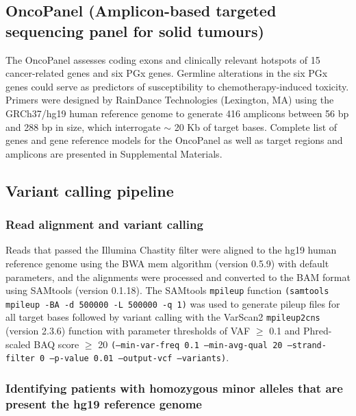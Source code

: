 \documentclass{bmcart}
\begin{document}
\subsection*{OncoPanel (Amplicon-based targeted sequencing panel for solid tumours)}

The OncoPanel assesses coding exons and clinically relevant hotspots of 15 cancer-related genes and six PGx genes. Germline alterations in the six PGx genes could serve as predictors of susceptibility to chemotherapy-induced toxicity. Primers were designed by RainDance Technologies (Lexington, MA) using the GRCh37/hg19 human reference genome to generate 416 amplicons between 56 bp and 288 bp in size, which interrogate $\sim$ 20 Kb of target bases. Complete list of genes and gene reference models for the OncoPanel as well as target regions and amplicons are presented in Supplemental Materials.

\subsection*{Variant calling pipeline}

\subsubsection*{Read alignment and variant calling}

Reads that passed the Illumina Chastity filter were aligned to the hg19 human reference genome using the BWA mem algorithm (version 0.5.9) with default parameters, and the alignments were processed and converted to the BAM format using SAMtools (version 0.1.18). The SAMtools \texttt{mpileup} function \texttt{(samtools mpileup -BA -d 500000 -L 500000 -q 1)} was used to generate pileup files for all target bases followed by variant calling with the VarScan2 \texttt{mpileup2cns} (version 2.3.6) function with parameter thresholds of VAF $\geq$ 0.1 and Phred-scaled BAQ score $\geq$ 20 \texttt{(--min-var-freq 0.1 --min-avg-qual 20 --strand-filter 0 --p-value 0.01 --output-vcf --variants)}.

\subsubsection*{Identifying patients with homozygous minor alleles that are present the hg19 reference genome}
\end{document}
